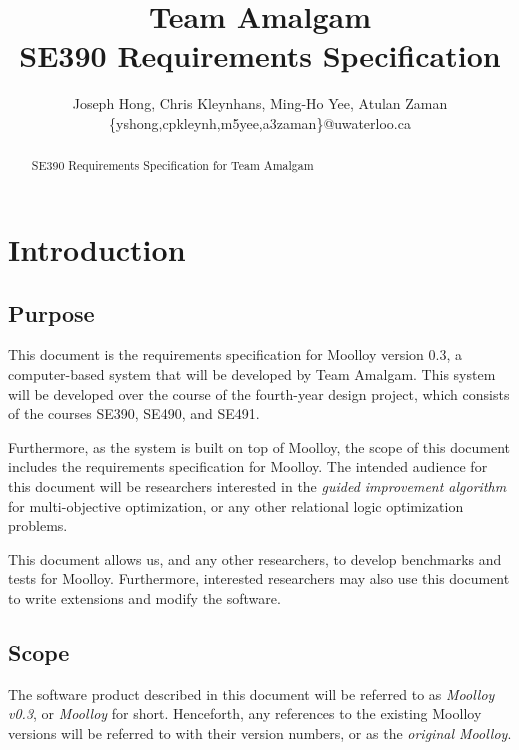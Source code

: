 \documentclass[11pt]{article}
\title{{\Large Team Amalgam} \\ SE390 Requirements Specification}
\author{Joseph Hong, Chris Kleynhans, Ming-Ho Yee, Atulan Zaman \\
        \{yshong,cpkleynh,m5yee,a3zaman\}@uwaterloo.ca}
\theoremstyle{definition}
\begin{document}
\maketitle

\begin{abstract}
SE390 Requirements Specification for Team Amalgam
\end{abstract}

\tableofcontents
\newpage

\section{Introduction}\label{sec:intro}
\subsection{Purpose}\label{sec:purpose}

This document is the requirements specification for Moolloy version
0.3, a computer-based system that will be developed by Team Amalgam.
This system will be developed over the course of the fourth-year design
project, which consists of the courses SE390, SE490, and SE491.

Furthermore, as the system is built on top of Moolloy, the scope of
this document includes the requirements specification for Moolloy.
The intended audience for this document will be researchers interested
in the \textit{guided improvement algorithm} for multi-objective
optimization, or any other relational logic optimization problems.

This document allows us, and any other researchers, to develop
benchmarks and tests for Moolloy. Furthermore, interested researchers
may also use this document to write extensions and modify the software.

\subsection{Scope}\label{sec:scope}

The software product described in this document will be referred to as
\textit{Moolloy v0.3}, or \textit{Moolloy} for short. Henceforth, any
references to the existing Moolloy versions will be referred to with
their version numbers, or as the \textit{original Moolloy}.
\end{document}
